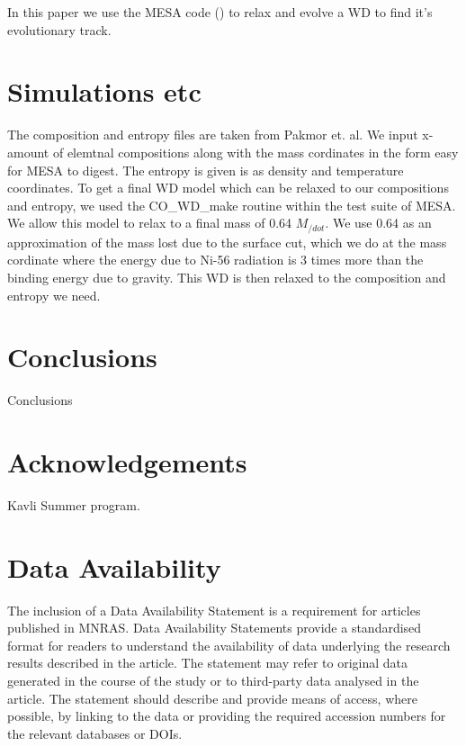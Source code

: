 \documentclass[fleqn,usenatbib]{mnras}
\begin{document}
In this paper we use the MESA code (\cite{2011ApJS..192....3P}) to relax and evolve a WD to find it's evolutionary track.

\section{Simulations etc}

The composition and entropy files are taken from Pakmor et. al. We input x-amount of elemtnal compositions along with the mass cordinates in the form easy for MESA to digest. The entropy is given is as density and temperature coordinates. To get a final WD model which can be relaxed to our compositions and entropy, we used the CO\_WD\_make routine within the test suite of MESA. We allow this model to relax to a final mass of 0.64 $M_{/dot}$. We use 0.64 as an approximation of the mass lost due to the surface cut, which we do at the mass cordinate where the energy due to Ni-56 radiation is 3 times more than the binding energy due to gravity. This WD is then relaxed to the composition and entropy we need. 

\section{Conclusions}

Conclusions

\section*{Acknowledgements}

Kavli Summer program.

\section*{Data Availability}

 
The inclusion of a Data Availability Statement is a requirement for articles published in MNRAS. Data Availability Statements provide a standardised format for readers to understand the availability of data underlying the research results described in the article. The statement may refer to original data generated in the course of the study or to third-party data analysed in the article. The statement should describe and provide means of access, where possible, by linking to the data or providing the required accession numbers for the relevant databases or DOIs.
\end{document}

